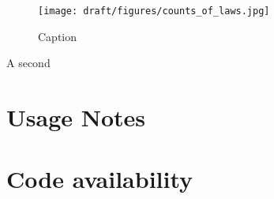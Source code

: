 \documentclass[fleqn,10pt]{wlscirep}
\begin{document}
\begin{figure}
    \centering
    \texttt{[image: draft/figures/counts\_of\_laws.jpg]}
    \caption{Caption}
    \label{fig:enter-label}
\end{figure}
A second 

\section*{Usage Notes}  \label{sec:usage}



\section*{Code availability}




\end{document}
